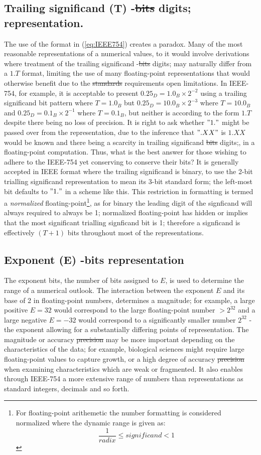 \documentclass[7pt]{article}
\begin{document}
\subsection*{Trailing significand (T) -\st{bits} digits; representation.}
The use of the format in (\ref{eq:IEEE754}) creates a paradox. Many of the most reasonable representations of a numerical values, to it would involve derivations where treatment of the trailing significand -\st{bits} digits; may naturally differ from a $1.T$ format, limiting the use of many floating-point representations that would otherwise benefit due to the \st{standards} requirements open limitations. In IEEE-754, for example, it is acceptable to present $0.25_D = 1.0_B \times 2^{-2}$ using a trailing significand bit pattern where $T=1.0_B$ but $0.25_D = 10.0_B \times 2^{-3}$ where $T=10.0_B$ and $0.25_D = 0.1_B \times 2^{-1}$ where $T= 0.1_B$, but neither is according to the form $1.T$ despite there being no loss of precision. It is right to ask whether $"1."$ might be passed over from the representation, due to the inference that $".XX"$ is $1.XX$ would be known and there	 being a scarcity in trailing significand \st{bits} digits;, in a floating-point computation. Thus, what is the best answer for those wishing to adhere to the IEEE-754 yet conserving to conserve their bits? It is generally accepted in IEEE format where the trailing significand is binary, to use the 2-bit trialling significand representation to mean its 3-bit standard form; the left-most bit defaults to $"1."$ in a scheme like this. This restriction in formatting is termed a \textit{normalized} floating-point\footnote{For floating-point arithemetic the number formatting is considered normalized where the dynamic range is given as: $$\dfrac{1}{radix} \leq significand < 1$$}, as for binary the leading digit of the signficand will always required to always be 1; normalized floating-point has hidden or implies that the most significant trialling signficand bit is 1; therefore a signficand is effectively $(T+1)$ bits throughout most of the representations.

\subsection*{Exponent (E) -bits representation}
The exponent bits, the number of bits assigned to $E$, is used to determine the range of a numerical outlook. The interaction between the exponent $E$ and its base of 2 in  floating-point numbers, determines a magnitude; for example, a large positive $E = 32$ would correspond to the large floating-point number $>2^{32}$ and a large negative $E = -32$ would correspond to a significantly smaller number $2^{32}$ - the exponent allowing for a substantially differing points of representation. The magnitude or accuracy \st{precision} may be more important depending on the characteristics of the data; for example, biological sciences might require large floating-point values to capture growth, or a high degree of accuracy \st{precision} when examining characteristics which are weak or fragmented. It also enables through IEEE-754 a more extensive range of numbers than representations as standard integers, decimals and so forth.
\end{document}
